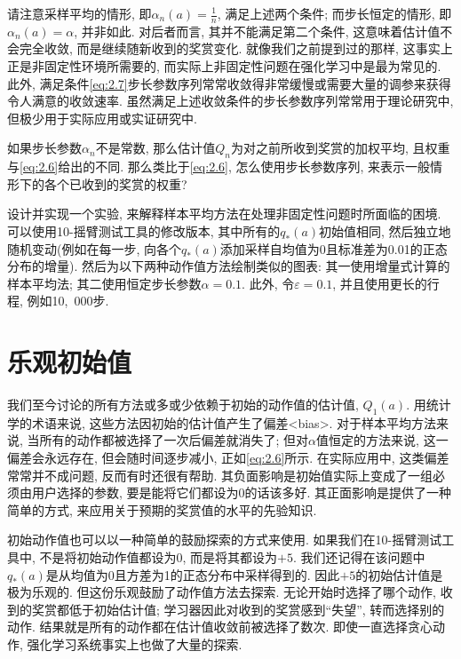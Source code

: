 请注意采样平均的情形, 即$\alpha_n(a) = \frac{1}{n}$, 满足上述两个条件; 而步长恒定的情形, 即$\alpha_n(a) = \alpha$, 并非如此. 对后者而言, 其并不能满足第二个条件, 这意味着估计值不会完全收敛, 而是继续随新收到的奖赏变化. 就像我们之前提到过的那样, 这事实上正是非固定性环境所需要的, 而实际上非固定性问题在强化学习中是最为常见的. 此外, 满足条件\eqref{eq:2.7}步长参数序列常常收敛得非常缓慢或需要大量的调参来获得令人满意的收敛速率. 虽然满足上述收敛条件的步长参数序列常常用于理论研究中, 但极少用于实际应用或实证研究中.

\begin{exer}
如果步长参数$\alpha_n$不是常数, 那么估计值$Q_n$为对之前所收到奖赏的加权平均, 且权重与\eqref{eq:2.6}给出的不同. 那么类比于\eqref{eq:2.6}, 怎么使用步长参数序列, 来表示一般情形下的各个已收到的奖赏的权重?
\end{exer}

\begin{exer}
设计并实现一个实验, 来解释样本平均方法在处理非固定性问题时所面临的困境. 可以使用10-摇臂测试工具的修改版本, 其中所有的$q_*(a)$初始值相同, 然后独立地随机变动(例如在每一步, 向各个$q_*(a)$添加采样自均值为0且标准差为0.01的正态分布的增量). 然后为以下两种动作值方法绘制类似的图表: 其一使用增量式计算的样本平均法; 其二使用恒定步长参数$\alpha = 0.1$. 此外, 令$\varepsilon = 0.1$, 并且使用更长的行程, 例如10,~000步.
\end{exer}

\section{乐观初始值}\label{sec:2.6}

我们至今讨论的所有方法或多或少依赖于初始的动作值的估计值, $Q_1(a)$. 用统计学的术语来说, 这些方法因初始的估计值产生了偏差<bias>. 对于样本平均方法来说, 当所有的动作都被选择了一次后偏差就消失了; 但对$\alpha$值恒定的方法来说, 这一偏差会永远存在, 但会随时间逐步减小, 正如\eqref{eq:2.6}所示. 在实际应用中, 这类偏差常常并不成问题, 反而有时还很有帮助. 其负面影响是初始值实际上变成了一组必须由用户选择的参数, 要是能将它们都设为0的话该多好. 其正面影响是提供了一种简单的方式, 来应用关于预期的奖赏值的水平的先验知识.

初始动作值也可以以一种简单的鼓励探索的方式来使用. 如果我们在10-摇臂测试工具中, 不是将初始动作值都设为0, 而是将其都设为$+5$. 我们还记得在该问题中$q_*(a)$是从均值为0且方差为1的正态分布中采样得到的. 因此$+5$的初始估计值是极为乐观的. 但这份乐观鼓励了动作值方法去探索. 无论开始时选择了哪个动作, 收到的奖赏都低于初始估计值; 学习器因此对收到的奖赏感到``失望'', 转而选择别的动作. 结果就是所有的动作都在估计值收敛前被选择了数次. 即使一直选择贪心动作, 强化学习系统事实上也做了大量的探索.

